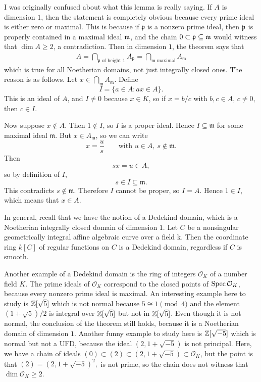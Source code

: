 \documentclass[12pt]{article}
\begin{document}
\begin{remark}
    I was originally confused about what this lemma is really saying. If $A$ is dimension $1$, then the statement is completely obvious because every prime ideal is either zero or maximal. This is because if $\mathfrak p$ is a nonzero prime ideal, then $\mathfrak{p}$ is properly contained in a maximal ideal $\mathfrak{m}$, and the chain $0 \subset \mathfrak{p} \subseteq \mathfrak{m}$ would witness that $\dim A \ge 2$, a contradiction. Then in dimension $1$, the theorem says that \begin{align*}
        A = \bigcap_{\mathfrak p \text{ of height }1} A_{\mathfrak p} = \bigcap_{\mathfrak m \text{ maximal}} A_{\mathfrak m}
    \end{align*}
    which is true for all Noetherian domains, not just integrally closed ones. The reason is as follows. Let $x\in \bigcap_{\mathfrak m} A_{\mathfrak m}$.
    Define
    \[
        I=\{a\in A: ax\in A\}.
    \]
    This is an ideal of $A$, and $I\neq 0$ because $x\in K$, so if $x=b/c$ with $b,c\in A$, $c\neq 0$, then $c\in I$.

    Now suppose $x\notin A$. Then $1\notin I$, so $I$ is a proper ideal. Hence $I\subseteq \mathfrak m$ for some maximal ideal $\mathfrak m$. But $x\in A_{\mathfrak m}$, so we can write
    \[
        x=\frac{u}{s}
        \qquad\text{with }u\in A,\ s\notin \mathfrak m.
    \]
    Then
    \[
        sx=u\in A,
    \]
    so by definition of $I$,
    \[
        s\in I\subseteq \mathfrak m.
    \]
    This contradicts $s\notin \mathfrak m$. Therefore $I$ cannot be proper, so $I=A$. Hence $1\in I$, which means that $x\in A$.
\end{remark}

\begin{remark}
    In general, recall that we have the notion of a Dedekind domain, which is a Noetherian integrally closed domain of dimension $1$. Let $C$ be a nonsingular geometrically integral affine algebraic curve over a field k. Then the coordinate ring $k[C]$ of regular functions on $C$ is a Dedekind domain, regardless if $C$ is smooth.

    Another example of a Dedekind domain is the ring of integers $\mathcal O_K$ of a number field $K$. The prime ideals of $\mathcal O_K$ correspond to the closed points of $\operatorname{Spec} \mathcal O_K$, because every nonzero prime ideal is maximal. An interesting example here to study is $\mathbb{Z}[\sqrt{5}]$ which is not normal because $5 \cong 1 \pmod 4$ and the element $(1+\sqrt{5})/2$ is integral over $\mathbb{Z}[\sqrt{5}]$ but not in $\mathbb{Z}[\sqrt{5}]$. Even though it is not normal, the conclusion of the theorem still holds, because it is a Noetherian domain of dimension $1$. Another funny example to study here is $\mathbb{Z}[\sqrt{-5}]$ which is normal but not a UFD, because the ideal $(2,1+\sqrt{-5})$ is not principal. Here, we have a chain of ideals $(0) \subset (2) \subset (2,1+\sqrt{-5}) \subset \mathcal O_K$, but the point is that $(2)=(2,1+\sqrt{-5})^2,$ is not prime, so the chain does not witness that $\dim \mathcal O_K \ge 2$.
\end{remark}
\end{document}
